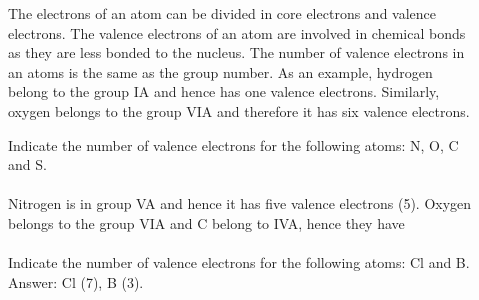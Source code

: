 \documentclass[main.tex]{subfiles}
\begin{document}
\begin{description}
\item[] The electrons of an atom can be divided in core electrons and valence electrons. The valence electrons of an atom are involved in chemical bonds as they are less bonded to the nucleus. The number of valence electrons in an atoms is the same as the group number. As an example, hydrogen  belong to the group IA and hence has one valence electrons. Similarly, oxygen  belongs to the group VIA and therefore it has six valence electrons.

\begin{example} %
Indicate the number of valence electrons for the following atoms: N, O, C and S.\\
\\
Nitrogen is in group VA and hence it has five valence electrons (5). Oxygen belongs to the group VIA and C belong to IVA, hence they have 
\\
\faDiamond\ \\
Indicate the number of valence electrons for the following atoms: Cl and B.\\
\flushright Answer: Cl (7), B (3).
\end{example}%



\end{description}
\end{document}
